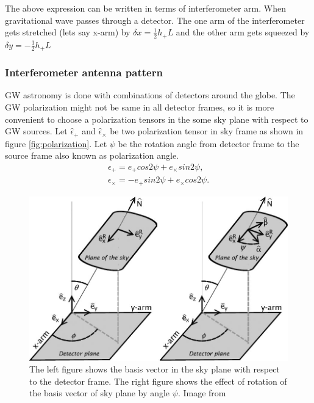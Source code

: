 \documentclass{ttuthes2007}
\begin{document}
The above expression can be written in terms of interferometer arm. When gravitational wave passes through a detector. The one arm
of the interferometer gets stretched (lets say x-arm) by
$\delta x=\frac{1}{2}h_+L$ and the other arm gets squeezed by $\delta y=-\frac{1}{2}h_+L$  

\subsubsection{Interferometer antenna pattern}
\ac{GW} astronomy is done with combinations of detectors around the globe. The
\ac{GW} polarization might not be same in all detector frames, so it is more
convenient to choose a polarization tensors in the some sky plane with respect
to \ac{GW} sources. Let $\hat\epsilon_+$ and $\hat\epsilon_\times$ be two
polarization tensor in sky frame as shown in figure \ref{fig:polarization}. Let
$\psi$ be the rotation angle from detector frame to the source frame also known
as polarization angle.
\begin{equation}
\begin{aligned}
\epsilon_+ = e_+cos2\psi + e_\times sin2\psi, \\
\epsilon_\times = -e_+sin2\psi + e_\times cos2\psi.
\end{aligned}
\end{equation}
\begin{figure}[h!]
	\includegraphics[width=\textwidth]{figure/antennae.jpg}
	\caption{The left figure shows the basis vector in the sky plane with
respect to the detector frame. The right figure shows the effect of rotation of
the basis vector of sky plane by angle $\psi$. Image from
~\cite{Sathyaprakash_2009}}
\end{figure}  
\end{document}
